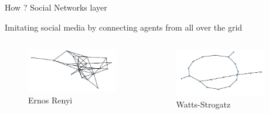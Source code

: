 \documentclass[10pt]{beamer}
\begin{document}
    \begin{frame}{How ? Social Networks layer}

        Imitating social media by connecting agents from all over the grid

        \begin{columns}

            \begin{column}{0.3\textwidth}
                \begin{figure}
                    \centering
                    \includegraphics[width=\textwidth]{pictures/networks/ernos_renyi.png}
                    \caption{Ernos Renyi}
                \end{figure}
            \end{column}
            \begin{column}{0.3\textwidth}
                \begin{figure}
                    \centering
                    \includegraphics[width=\textwidth]{pictures/networks/watts_strogatz.png}
                    \caption{Watts-Strogatz}
                \end{figure}
            \end{column}
            \begin{column}{0.3\textwidth}

\end{column}
\end{columns}
\end{frame}
\end{document}
